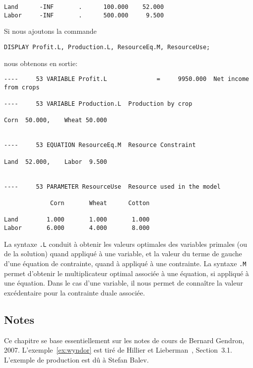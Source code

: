 \begin{example}
\begin{verbatim}
Land      -INF       .      100.000    52.000      
Labor     -INF       .      500.000     9.500
\end{verbatim}
Si nous ajoutons la commande
\begin{verbatim}
DISPLAY Profit.L, Production.L, ResourceEq.M, ResourceUse;
\end{verbatim}
nous obtenons en sortie:
\begin{verbatim}
----     53 VARIABLE Profit.L              =     9950.000  Net income from crops

----     53 VARIABLE Production.L  Production by crop

Corn  50.000,    Wheat 50.000


----     53 EQUATION ResourceEq.M  Resource Constraint

Land  52.000,    Labor  9.500


----     53 PARAMETER ResourceUse  Resource used in the model

             Corn       Wheat      Cotton

Land        1.000       1.000       1.000
Labor       6.000       4.000       8.000
\end{verbatim}
La syntaxe \verb|.L| conduit à obtenir les valeurs optimales des variables primales (ou de la solution) quand appliqué à une variable, et la valeur du terme de gauche d'une équation de contrainte, quand à appliqué à une contrainte.
La syntaxe \verb|.M| permet d'obtenir le multiplicateur optimal associée à une équation, si appliqué à une équation.
Dans le cas d'une variable, il nous permet de connaître la valeur excédentaire pour la contrainte duale associée.
\end{example}

\begin{small}
\section{Notes}

Ce chapitre se base essentiellement sur les notes de cours de Bernard Gendron, 2007.
L'exemple~\ref{ex:wyndor} est tiré de Hillier et Lieberman~\cite{HillLieb01}, Section~3.1.
L'exemple de production est dû à Stefan Balev.

\end{small}
